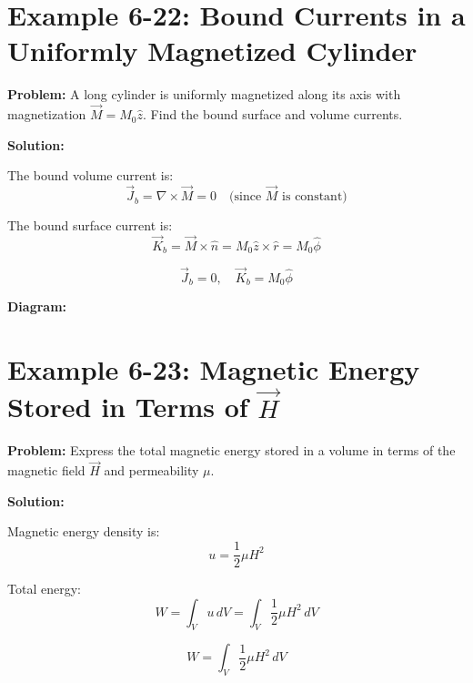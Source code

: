 \documentclass[12pt]{article}
\begin{document}
\section*{Example 6-22: Bound Currents in a Uniformly Magnetized Cylinder}

\textbf{Problem:}  
A long cylinder is uniformly magnetized along its axis with magnetization \( \vec{M} = M_0 \hat{z} \). Find the bound surface and volume currents.

\textbf{Solution:}

The bound volume current is:
\[
\vec{J}_b = \nabla \times \vec{M} = 0 \quad \text{(since } \vec{M} \text{ is constant)}
\]

The bound surface current is:
\[
\vec{K}_b = \vec{M} \times \hat{n} = M_0 \hat{z} \times \hat{r} = M_0 \hat{\phi}
\]

\begin{tcolorbox}
\[
\boxed{\vec{J}_b = 0}, \quad \boxed{\vec{K}_b = M_0 \hat{\phi}}
\]
\end{tcolorbox}

\textbf{Diagram:}
\begin{center}
\end{center}



\section*{Example 6-23: Magnetic Energy Stored in Terms of \( \vec{H} \)}

\textbf{Problem:}  
Express the total magnetic energy stored in a volume in terms of the magnetic field \( \vec{H} \) and permeability \( \mu \).

\textbf{Solution:}

Magnetic energy density is:
\[
u = \frac{1}{2} \mu H^2
\]

Total energy:
\[
W = \int_V u \, dV = \int_V \frac{1}{2} \mu H^2 \, dV
\]

\begin{tcolorbox}
\[
\boxed{W = \int_V \frac{1}{2} \mu H^2 \, dV}
\]
\end{tcolorbox}
\end{document}
